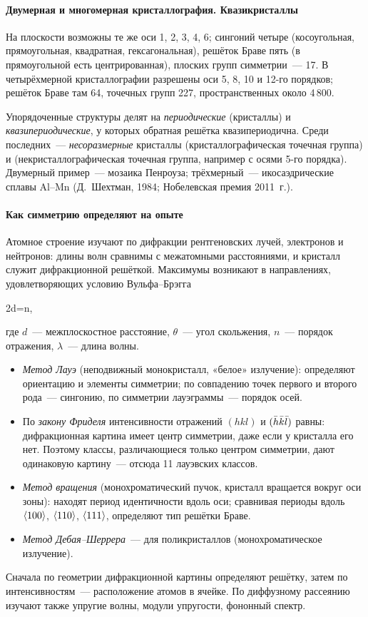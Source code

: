 \paragraph{Двумерная и многомерная кристаллография. Квазикристаллы}
На плоскости возможны те же оси 1, 2, 3, 4, 6; сингоний четыре
(косоугольная, прямоугольная, квадратная, гексагональная), решёток Браве
пять (в прямоугольной есть центрированная), плоских групп симметрии~—
17. В четырёхмерной кристаллографии разрешены оси 5, 8, 10 и 12-го
порядков; решёток Браве там 64, точечных групп 227, пространственных
около 4\,800.

Упорядоченные структуры делят на \emph{периодические} (кристаллы) и
\emph{квазипериодические}, у которых обратная решётка квазипериодична.
Среди последних~— \emph{несоразмерные} кристаллы (кристаллографическая
точечная группа) и  (некристаллографическая точечная
группа, например с осями 5-го порядка). Двумерный пример~— мозаика Пенроуза;
трёхмерный~— икосаэдрические сплавы Al--Mn (Д.~Шехтман, 1984;
Нобелевская премия 2011~г.).

\paragraph{Как симметрию определяют на опыте}
Атомное строение изучают по дифракции рентгеновских лучей, электронов и
нейтронов: длины волн сравнимы с межатомными расстояниями, и кристалл
служит дифракционной решёткой. Максимумы возникают в направлениях,
удовлетворяющих условию Вульфа--Брэгга
\begin{keyeq}\label{eq:bragg}
2d\sin\theta=n\lambda ,
\end{keyeq}
где $d$~— межплоскостное расстояние, $\theta$~— угол скольжения, $n$~— порядок
отражения, $\lambda$~— длина волны.
\begin{itemize}
\item \emph{Метод Лауэ} (неподвижный монокристалл, «белое» излучение):
определяют ориентацию и элементы симметрии; по совпадению точек первого и
второго рода~— сингонию, по симметрии лауэграммы~— порядок осей.
\item По \emph{закону Фриделя} интенсивности отражений $(hkl)$ и
$(\bar{h}\bar{k}\bar{l})$ равны: дифракционная картина имеет центр симметрии, даже
если у кристалла его нет. Поэтому классы, различающиеся только центром
симметрии, дают одинаковую картину~— отсюда 11 лауэвских классов.
\item \emph{Метод вращения} (монохроматический пучок, кристалл вращается
вокруг оси зоны): находят период идентичности вдоль оси; сравнивая периоды
вдоль $\langle 100\rangle$, $\langle 110\rangle$, $\langle 111\rangle$, определяют тип решётки Браве.
\item \emph{Метод Дебая--Шеррера}~— для поликристаллов (монохроматическое
излучение).
\end{itemize}
Сначала по геометрии дифракционной картины определяют решётку, затем по
интенсивностям~— расположение атомов в ячейке. По диффузному рассеянию
изучают также упругие волны, модули упругости, фононный спектр.

